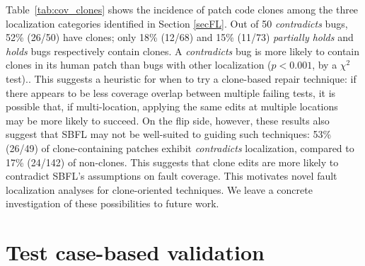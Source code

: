 \documentclass[10pt, conference]{IEEEtran}
\begin{document}
Table~\ref{tab:cov_clones} shows the incidence of patch code clones among the three 
localization categories identified in Section \ref{secFL}. 
Out of 50 \emph{contradicts} bugs, 52\% (26/50) have clones; only 
18\% (12/68) and 15\% (11/73)
\emph{partially holds} and \emph{holds} bugs respectively contain clones.
A \emph{contradicts} bug is more likely to contain clones in its
human patch than bugs with other localization  ($p < 0.001$, by a $\chi^2$ test).. 
This suggests a heuristic for when to try a clone-based repair technique: if there
appears to be less coverage overlap between multiple failing tests, it is
possible that, if multi-location, 
applying the same edits at multiple locations~\cite{saha2019harnessing} may be
more likely to succeed. On the flip
side, however, these results also suggest that SBFL may not be well-suited to
guiding such techniques: 
53\% (26/49) of clone-containing patches exhibit \emph{contradicts}
localization, compared to 17\% (24/142) of non-clones. This suggests that clone
edits  are more likely to contradict SBFL's assumptions
on fault coverage.  This motivates novel fault localization analyses for
clone-oriented techniques.   We
leave a concrete investigation of these possibilities to future work.  


\section{Test case-based validation}
\label{sec:tests}
\end{document}
